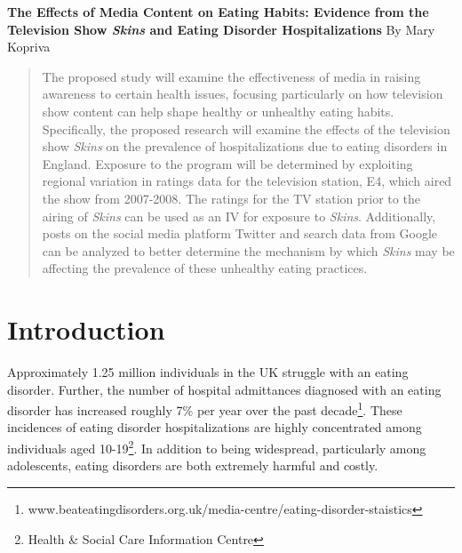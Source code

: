 \documentclass[12pt]{article}
\begin{document}
	
	\singlespacing
	
	
	
	\begin{center}
		
		{\bf {\Large The Effects of Media Content on Eating Habits: Evidence from the Television Show \textit{Skins} and Eating Disorder Hospitalizations}} 
		\vskip20pt
		{\large By Mary Kopriva}
		
		
	\end{center}
	
	\vskip20pt
	
	\begin{abstract}
		
		\onehalfspacing
		
		
		
		{The proposed study will examine the effectiveness of media in raising awareness to certain health issues, focusing particularly on how television show content can help shape healthy or unhealthy eating habits. Specifically, the proposed research will examine the effects of the television show \textit{Skins} on the prevalence of hospitalizations due to eating disorders in England. Exposure to the program will be determined by exploiting regional variation in ratings data for the television station, E4, which aired the show from 2007-2008. The ratings for the TV station prior to the airing of \textit{Skins} can be used as an IV for exposure to \textit{Skins}. Additionally, posts on the social media platform Twitter and search data from Google can be analyzed to better determine the mechanism by which \textit{Skins} may be affecting the prevalence of these unhealthy eating practices.}
		
		
	\end{abstract}		
	
	\pagebreak
	
\section{Introduction}	
	
	\doublespacing

Approximately 1.25 million individuals in the UK struggle with an eating disorder. Further, the number of hospital admittances diagnosed with an eating disorder has increased roughly 7\% per year over the past decade\footnote{www.beateatingdisorders.org.uk/media-centre/eating-disorder-staistics}. These incidences of eating disorder hospitalizations are highly concentrated among individuals aged 10-19\footnote{Health \& Social Care Information Centre}. In addition to being widespread, particularly among adolescents, eating disorders are both extremely harmful and costly. 
\end{document}
